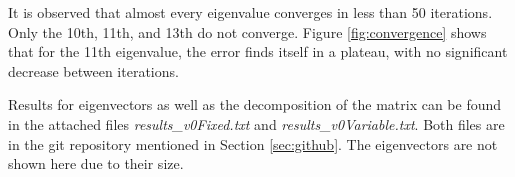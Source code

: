 It is observed that almost every eigenvalue converges in less than 50 iterations. Only the 10th, 11th, and 13th do not converge. Figure \ref{fig:convergence} shows that for the 11th eigenvalue, the error finds itself in a plateau, with no significant decrease between iterations. 

Results for eigenvectors as well as the decomposition of the matrix can be found in the attached files \textit{results\_v0Fixed.txt} and \textit{results\_v0Variable.txt}. Both files are in the git repository mentioned in Section \ref{sec:github}. The eigenvectors are not shown here due to their size. 

